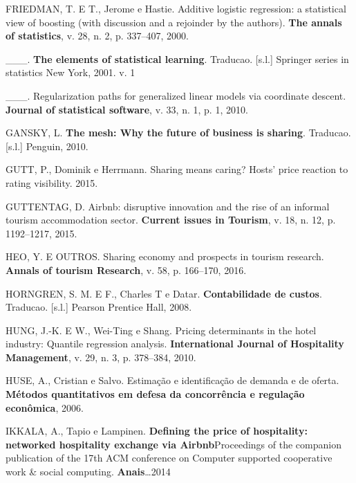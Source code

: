 \documentclass[
	12pt,				%
	a4paper,		%
	oneside,    %
	chapter=TITLE,		   %
	section=TITLE,		   %
	subsection=TITLE,	   %
	subsubsection=TITLE, %
	english,			%
	french,				%
	spanish,			%
	brazil,				%
]{abntex2}
\begin{document}
\leavevmode\hypertarget{ref-friedman2000additive}{}%
FRIEDMAN, T. E T., Jerome e Hastie. Additive logistic regression: a
statistical view of boosting (with discussion and a rejoinder by the
authors). \textbf{The annals of statistics}, v. 28, n. 2, p. 337--407,
2000.

\leavevmode\hypertarget{ref-friedman2001elements}{}%
\_\_\_. \textbf{The elements of statistical learning}. Traducao.
{[}s.l.{]} Springer series in statistics New York, 2001. v. 1

\leavevmode\hypertarget{ref-friedman2010regularization}{}%
\_\_\_. Regularization paths for generalized linear models via
coordinate descent. \textbf{Journal of statistical software}, v. 33, n.
1, p. 1, 2010.

\leavevmode\hypertarget{ref-gansky2010mesh}{}%
GANSKY, L. \textbf{The mesh: Why the future of business is sharing}.
Traducao. {[}s.l.{]} Penguin, 2010.

\leavevmode\hypertarget{ref-gutt2015sharing}{}%
GUTT, P., Dominik e Herrmann. Sharing means caring? Hosts' price
reaction to rating visibility. 2015.

\leavevmode\hypertarget{ref-guttentag2015airbnb}{}%
GUTTENTAG, D. Airbnb: disruptive innovation and the rise of an informal
tourism accommodation sector. \textbf{Current issues in Tourism}, v. 18,
n. 12, p. 1192--1217, 2015.

\leavevmode\hypertarget{ref-heo2016sharing}{}%
HEO, Y. E OUTROS. Sharing economy and prospects in tourism research.
\textbf{Annals of tourism Research}, v. 58, p. 166--170, 2016.

\leavevmode\hypertarget{ref-horngren2008contabilidade}{}%
HORNGREN, S. M. E F., Charles T e Datar. \textbf{Contabilidade de
custos}. Traducao. {[}s.l.{]} Pearson Prentice Hall, 2008.

\leavevmode\hypertarget{ref-hung2010pricing}{}%
HUNG, J.-K. E W., Wei-Ting e Shang. Pricing determinants in the hotel
industry: Quantile regression analysis. \textbf{International Journal of
Hospitality Management}, v. 29, n. 3, p. 378--384, 2010.

\leavevmode\hypertarget{ref-huse2006estimaccao}{}%
HUSE, A., Cristian e Salvo. Estimação e identificação de demanda e de
oferta. \textbf{Métodos quantitativos em defesa da concorrência e
regulação econômica}, 2006.

\leavevmode\hypertarget{ref-ikkala2014defining}{}%
IKKALA, A., Tapio e Lampinen. \textbf{Defining the price of hospitality:
networked hospitality exchange via Airbnb}Proceedings of the companion
publication of the 17th ACM conference on Computer supported cooperative
work \& social computing. \textbf{Anais}\ldots2014
\end{document}
